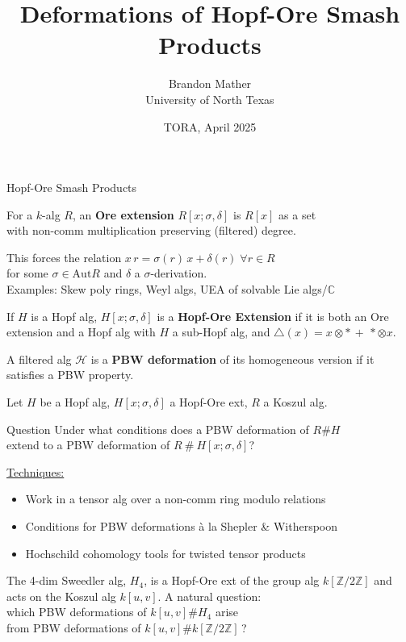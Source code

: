 \documentclass{beamer}
\title{Deformations of Hopf-Ore Smash Products}
\author{Brandon Mather\\ University of North Texas}
\date{TORA, April 2025}
\begin{document}
\maketitle

\begin{frame}{Hopf-Ore Smash Products}
\begin{definition}
    For a \(k\)-alg \(R\), an \textbf{Ore extension} \(R[x;\sigma,\delta]\) is \(R[x]\) as a set \\with non-comm multiplication preserving (filtered) degree. 
\end{definition}
This forces the relation \(x\,r=\sigma(r)\,x+\delta(r)\;\forall r\in R\) \\ for some \(\sigma\in \text{Aut}R\) and \(\delta\) a \(\sigma\)-derivation.
\\Examples: Skew poly rings, Weyl algs, UEA of solvable Lie algs/\(\mathbb{C}\)
\begin{definition}
    If \(H\) is a Hopf alg, \(H[x;\sigma,\delta]\) is a \textbf{Hopf-Ore Extension} if it is both an Ore extension and a Hopf alg with \(H\) a sub-Hopf alg, and \(\triangle(x)=x\otimes \ast\,+\,*\otimes x\).
\end{definition}
\begin{definition}
    A filtered alg \(\mathcal{H}\) is a \textbf{PBW deformation} of its homogeneous version if it satisfies a PBW property.
\end{definition}
\end{frame}

\begin{frame} 
    Let \(H\) be a Hopf alg, \(H[x;\sigma,\delta]\) a Hopf-Ore ext, \(R\) a Koszul alg.
\begin{beamerboxesrounded}{Question}
    Under what conditions does a PBW deformation of \(R\#H\) \\extend to a PBW deformation of \(R\ \#\ H[x;\sigma,\delta]\)?
\end{beamerboxesrounded}

\underline{Techniques:}
\begin{itemize}
    \item Work in a tensor alg over a non-comm ring modulo relations
    \item Conditions for PBW deformations \`a la Shepler \& Witherspoon
    \item Hochschild cohomology tools for twisted tensor products
\end{itemize}
\begin{example}
   The 4-dim Sweedler alg, \(H_4\), is a  Hopf-Ore ext of the group alg \(k[\mathbb{Z}/2\mathbb{Z}]\) and acts on the Koszul alg \(k[u,v]\).
   A natural question: \\which PBW deformations of \(k[u,v]\#H_4\) arise \\ \hspace{0.2cm}from PBW deformations of \(k[u,v]\#k[\mathbb{Z}/2\mathbb{Z}]\)\,?
\end{example}

\end{frame}
\end{document}
